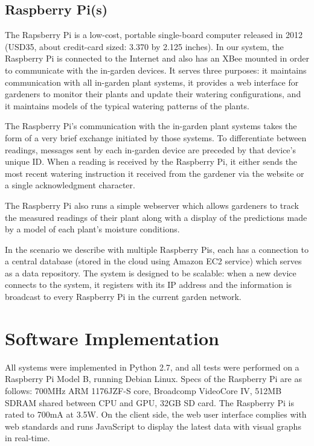 \documentclass[a4paper]{acm_proc_article-sp}
\begin{document}
\subsection{Raspberry Pi(s)}

The Rapsberry Pi is a low-cost, portable single-board computer released in 2012 (USD35, about credit-card sized: 3.370 by 2.125 inches). In our system, the Raspberry Pi is connected to the Internet and also has an XBee mounted in order to communicate with the in-garden devices.  It serves three purposes: it maintains communication with all in-garden plant systems, it provides a web interface for gardeners to monitor their plants and update their watering configurations, and it maintains models of the typical watering patterns of the plants.

The Raspberry Pi's communication with the in-garden plant systems takes the form of a very brief exchange initiated by those systems.  To differentiate between readings, messages sent by each in-garden device are preceded by that device's unique ID.  When a reading is received by the Raspberry Pi, it either sends the most recent watering instruction it received from the gardener via the website or a single acknowledgment character.

The Raspberry Pi also runs a simple webserver which allows gardeners to track the measured readings of their plant along with a display of the predictions made by a model of each plant's moisture conditions.

In the scenario we describe with multiple Raspberry Pis, each has a connection to a central database (stored in the cloud using Amazon EC2 service) which serves as a data repository. The system is designed to be scalable: when a new device connects to the system, it registers with its IP address and the information is broadcast to every Raspberry Pi in the current garden network. 

\section{Software Implementation}

All systems were implemented in Python 2.7, and all tests were performed on a Raspberry Pi Model B, running Debian Linux.  Specs of the Raspberry Pi are as follows: 700MHz ARM 1176JZF-S core, Broadcomp VideoCore IV, 512MB SDRAM shared between CPU and GPU, 32GB SD card.  The Raspberry Pi is rated to 700mA at 3.5W.  On the client side, the web user interface complies with web standards and runs JavaScript to display the latest data with visual graphs in real-time.
\end{document}
